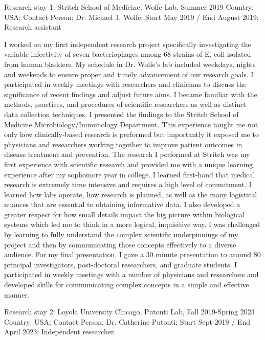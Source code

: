 Research stay 1: Stritch School of Medicine, Wolfe Lab, Summer 2019
Country: USA; Contact Person: Dr. Michael J. Wolfe; Start May 2019 / End August 2019; Research assistant

I worked on my first independent research project specifically investigating the variable infectivity of seven bacteriophages among 68
strains of E. coli isolated from human bladders. My schedule in Dr. Wolfe’s lab included weekdays, nights and weekends to ensure proper
and timely advancement of our research goals. I participated in weekly meetings with researchers and clinicians to discuss the
significance of recent findings and adjust future aims. I became familiar with the methods, practices, and procedures of scientific
researchers as well as distinct data collection techniques. I presented the findings to the Stritch School of Medicine
Microbiology/Immunology Department.
This experience taught me not only how clinically-based research is performed but importantly it exposed me to physicians and
researchers working together to improve patient outcomes in disease treatment and prevention. The research I performed at Stritch was
my first experience with scientific research and provided me with a unique learning experience after my sophomore year in college. I
learned first-hand that medical research is extremely time intensive and requires a high level of commitment. I learned how labs operate,
how research is planned, as well as the many logistical nuances that are essential to obtaining informative data. I also developed a
greater respect for how small details impact the big picture within biological systems which led me to think in a more logical, inquisitive
way. I was challenged by learning to fully understand the complex scientific underpinnings of my project and then by communicating
those concepts effectively to a diverse audience. For my final presentation, I gave a 30 minute presentation to around 80 principal
investigators, post-doctoral researchers, and graduate students. I participated in weekly meetings with a number of physicians and
researchers and developed skills for communicating complex concepts in a simple and effective manner.


Research stay 2: Loyola University Chicago, Putonti Lab, Fall 2019-Spring 2023
Country: USA; Contact Person: Dr. Catherine Putonti; Start Sept 2019 / End April 2023; Independent researcher.

